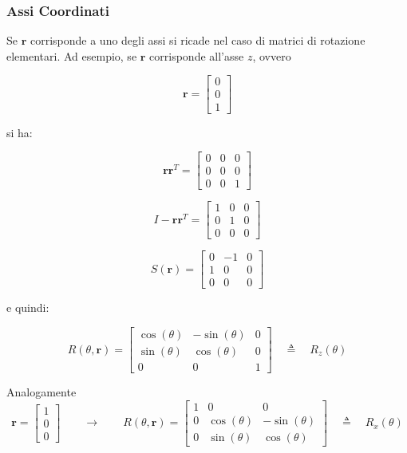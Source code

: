 \documentclass[11pt, a4paper]{report}
\begin{document}
\subsubsection*{Assi Coordinati}
Se \(\mathbf{r}\) corrisponde a uno degli assi si ricade nel caso di matrici di rotazione elementari.
Ad esempio, se \(\mathbf{r}\) corrisponde all'asse \(z\), ovvero

\[
\mathbf{r} = \begin{bmatrix}
0 \\
0 \\
1
\end{bmatrix}
\]

si ha:

\[
\mathbf{r} \mathbf{r}^T = \begin{bmatrix}
0 & 0 & 0 \\
0 & 0 & 0 \\
0 & 0 & 1
\end{bmatrix}
\]

\[
I - \mathbf{r} \mathbf{r}^T = \begin{bmatrix}
1 & 0 & 0 \\
0 & 1 & 0 \\
0 & 0 & 0
\end{bmatrix}
\]

\[
S(\mathbf{r}) = \begin{bmatrix}
0 & -1 & 0 \\
1 & 0 & 0 \\
0 & 0 & 0
\end{bmatrix}
\]

e quindi:

\[
R(\theta, \mathbf{r}) = \begin{bmatrix}
\cos(\theta) & -\sin(\theta) & 0 \\
\sin(\theta) & \cos(\theta) & 0 \\
0 & 0 & 1
\end{bmatrix}
\quad \triangleq \quad R_z(\theta)
\]

Analogamente
\[
    \mathbf{r} =
    \begin{bmatrix}
    1 \\
    0 \\
    0
    \end{bmatrix}
    \qquad\longrightarrow\qquad
    R(\theta, \mathbf{r}) = \begin{bmatrix}
    1 & 0 & 0 \\
    0 & \cos(\theta) & -\sin(\theta) \\
    0 & \sin(\theta) & \cos(\theta)
    \end{bmatrix}
    \quad \triangleq \quad R_x(\theta)
\]
\end{document}
